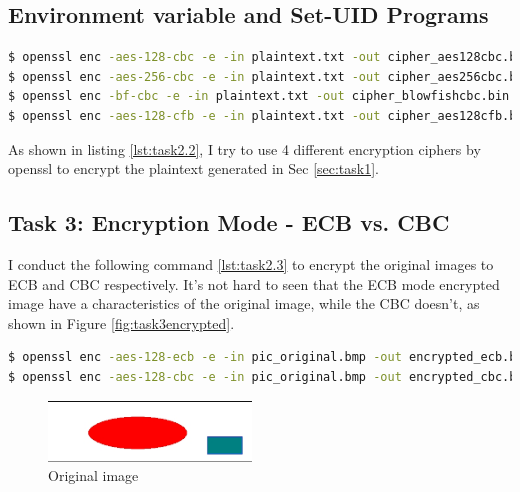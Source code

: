 \documentclass[a4paper]{article}
\begin{document}
\subsection{Environment variable and Set-UID Programs}

\begin{lstlisting}[caption={TASK\ 2.2\ Command\ Line},label={lst:task2.2},language=BASH,breaklines=true]
$ openssl enc -aes-128-cbc -e -in plaintext.txt -out cipher_aes128cbc.bin -K 00112233445566778889aabbccddeeff -iv 0102030405060708 # aes-128-cbc encryption
$ openssl enc -aes-256-cbc -e -in plaintext.txt -out cipher_aes256cbc.bin -K 00112233445566778889aabbccddeeff -iv 0102030405060708 # aes-256-cbc encryption
$ openssl enc -bf-cbc -e -in plaintext.txt -out cipher_blowfishcbc.bin -K 00112233445566778889aabbccddeeff -iv 0102030405060708 # blowfish encryption
$ openssl enc -aes-128-cfb -e -in plaintext.txt -out cipher_aes128cfb.bin -K 00112233445566778889aabbccddeeff -iv 0102030405060708 # aes-128-cfb encryption
\end{lstlisting}

As shown in listing \ref{lst:task2.2}, I try to use 4 different encryption ciphers by openssl to encrypt the plaintext generated in Sec \ref{sec:task1}.

\subsection{Task 3: Encryption Mode - ECB vs. CBC}
I conduct the following command \ref{lst:task2.3} to encrypt the original images to ECB and CBC respectively. It's not hard to seen that the ECB mode encrypted image have a characteristics of the original image, while the CBC doesn't, as shown in Figure \ref{fig:task3encrypted}.
\begin{lstlisting}[caption={TASK\ 2.3\ Command\ Lines},label={lst:task2.3},language=BASH,breaklines=true]
$ openssl enc -aes-128-ecb -e -in pic_original.bmp -out encrypted_ecb.bmp -K 00112233445566778889aabbccddeeff # ECB Mode
$ openssl enc -aes-128-cbc -e -in pic_original.bmp -out encrypted_cbc.bmp -K 00112233445566778889aabbccddeeff  -iv 0102030405060708 # CBC Mode
\end{lstlisting}

\begin{figure}[h]
    \centering
       \includegraphics[width=0.48\textwidth]{figures/task3/originalimage.png}
    \caption{Original image}\label{fig:task3original}
\end{figure}
\end{document}
